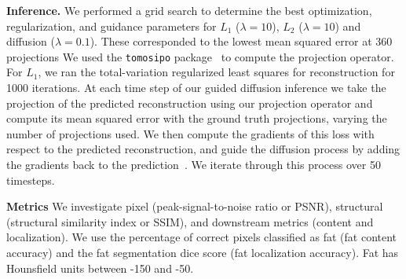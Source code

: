 \noindent\textbf{Inference. }
We performed a grid search to determine the best optimization, regularization, and guidance parameters for $L_1$ ($\lambda=10$), $L_2$ ($\lambda=10$) and diffusion ($\lambda=0.1$).
These corresponded to the lowest mean squared error at 360 projections %
We used the \verb|tomosipo| package~\cite{hendriksen2021tomosipo} to compute the projection operator.
For $L_1$, we ran the total-variation regularized least squares for reconstruction for 1000 iterations. 
At each time step of our guided diffusion inference we take the projection of the predicted reconstruction using our projection operator and compute its mean squared error with the ground truth projections, varying the number of projections used. We then compute the gradients of this loss with respect to the predicted reconstruction, and guide the diffusion process by adding the gradients back to the prediction~\cite{dhariwal2021diffusion,graikos2022diffusion}. We iterate through this process over 50 timesteps.

\noindent\textbf{Metrics}
We investigate pixel (peak-signal-to-noise ratio or PSNR), structural (structural similarity index or SSIM), and downstream metrics (content and localization).
We use the percentage of correct pixels classified as fat (fat content accuracy) and the fat segmentation dice score (fat localization accuracy).
Fat has Hounsfield units between -150 and -50.